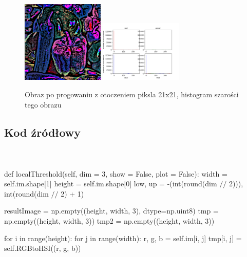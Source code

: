 \documentclass[final,a4paper,openany,12pt]{mwbk}
\begin{document}
\begin{figure}[H]
	\begin{center}
		\includegraphics[width=0.35\textwidth]{peppers_color_locThreshold_result}
		\includegraphics[width=0.35\textwidth]{peppers_color_locThreshold_histogram}
	\end{center}
	\caption{Obraz po progowaniu z otoczeniem piksla 21x21, histogram szarości tego obrazu}
\end{figure}

\subsection*{Kod źródłowy}
\hfill
\\\\
\noindent def localThreshold(self, dim = 3, show = False, plot = False): \newline
\indent width = self.im.shape[1] \newline
\indent height = self.im.shape[0] \newline
\indent low, up = -(int(round(dim $//$ 2))), int(round(dim $//$ 2) + 1) \newline

resultImage = np.empty((height, width, 3), dtype=np.uint8) \newline
\indent tmp = np.empty((height, width, 3)) \newline
\indent tmp2 = np.empty((height, width, 3)) \newline


for i in range(height): \newline
\indent for j in range(width): \newline
\indent r, g, b = self.im[i, j] \newline
\indent tmp[i, j] = self.RGBtoHSI((r, g, b)) \newline
\end{document}
